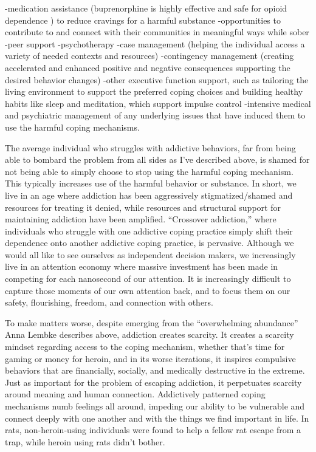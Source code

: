 \documentclass[12pt,letterpaper]{book}
\begin{document}
-medication assistance (buprenorphine is highly effective and safe for opioid dependence \cite{Mattickbuprenorphine}) to reduce cravings for a harmful substance
-opportunities to contribute to and connect with their communities in meaningful ways while sober
-peer support
-psychotherapy
-case management (helping the individual access a variety of needed contexts and resources)
-contingency management (creating accelerated and enhanced positive and negative consequences supporting the desired behavior changes) 
-other executive function support, such as tailoring the living environment to support the preferred coping choices and building healthy habits like sleep and meditation, which support impulse control
-intensive medical and psychiatric management of any underlying issues that have induced them to use the harmful coping mechanisms.

The average individual who struggles with addictive behaviors, far from being able to bombard the problem from all sides as I've described above, is shamed for not being able to simply choose to stop using the harmful coping mechanism. This typically increases use of the harmful behavior or substance. In short, we live in an age where addiction has been aggressively stigmatized/shamed and resources for treating it denied, while resources and structural support for maintaining addiction have been amplified. “Crossover addiction,” where individuals who struggle with one addictive coping practice simply shift their dependence onto another addictive coping practice, is pervasive. Although we would all like to see ourselves as independent decision makers, we increasingly live in an attention economy where massive investment has been made in competing for each nanosecond of our attention. It is increasingly difficult to capture those moments of our own attention back, and to focus them on our safety, flourishing, freedom, and connection with others.

To make matters worse, despite emerging from the “overwhelming abundance” Anna Lembke describes above, addiction creates scarcity. It creates a scarcity mindset regarding access to the coping mechanism, whether that's time for gaming or money for heroin, and in its worse iterations, it inspires compulsive behaviors that are financially, socially, and medically destructive in the extreme. Just as important for the problem of escaping addiction, it perpetuates scarcity around meaning and human connection. Addictively patterned coping mechanisms numb feelings all around, impeding our ability to be vulnerable and connect deeply with one another and with the things we find important in life. In rats, non-heroin-using individuals were found to help a fellow rat escape from a trap, while heroin using rats didn't bother.
\end{document}
